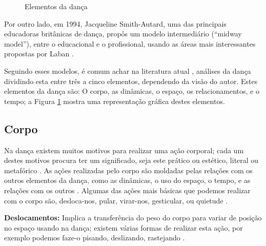 \begin{figure}
\centering
{}
\caption{Elementos da dança}
\label{fig:elementosdanca1}
\end{figure}
Por outro lado, em 1994, Jacqueline Smith-Autard, uma das principais educadoras britânicas de dança, 
propôs um modelo intermediário (``midway model''), entre o educacional e o profissional, 
usando as áreas mais interessantes propostas por Laban \cite[pp. 12]{paine2014complete}.

Seguindo esses modelos, é comum achar na literatura atual 
\cite[pp. 4]{carline2011lesson}       %
\cite[pp. 13,27]{paine2014complete}   %
\cite[pp. 69]{schrader2005sense}      %
\cite[pp. 131]{mccutchen2006teaching},%
 análises  da dança dividindo esta entre três a cinco elementos,
dependendo da visão do autor.
Estes elementos da dança são: O corpo, as dinâmicas, o espaço, os relacionamentos, e o tempo;
a Figura \ref{fig:elementosdanca1} mostra uma representação gráfica destes elementos.



\subsection{Corpo}
Na dança existem muitos motivos para realizar uma ação corporal;
cada um destes motivos procura ter um significado, seja este prático ou estético, literal ou metafórico \cite[pp. 5]{carline2011lesson}.
As ações realizadas pelo corpo são moldadas pelas relações com os outros elementos da dança,
como as dinâmicas, o uso do espaço, o tempo, e as relações com os outros \cite[pp. 5]{carline2011lesson}.
Algumas das ações mais básicas que podemos realizar com o corpo são,
desloca-nos, pular, virar-nos, gesticular, ou quietude \cite[pp. 27]{paine2014complete}.

\textbf{Deslocamentos:} Implica a transferência do peso do corpo 
para variar de posição no espaço usando na dança;
existem várias formas de realizar esta ação,
por exemplo podemos faze-o pisando, deslizando, rastejando \cite[pp. 28]{paine2014complete}.

